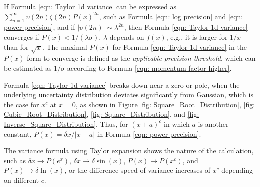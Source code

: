 \documentclass[twoside]{article}
\numberwithin{equation}{section}
\begin{document}
If Formula \eqref{eqn: Taylor 1d variance} can be expressed as $\sum_{n=1}^{\infty} \upsilon(2n) \zeta(2n) P(x)^{2n}$, such as Formula \eqref{eqn: log precision} and \eqref{eqn: power precision}, and if $|\upsilon(2n)| \sim \lambda^{2n}$, then Formula \eqref{eqn: Taylor 1d variance} converges if $P(x) < 1/(\lambda \sigma)$.
$\lambda$ depends on $f(x)$, e.g., it is larger for $1/x$ than for $\sqrt{x}$.
The maximal $P(x)$ for Formula \eqref{eqn: Taylor 1d variance} in the $P(x)$-form to converge is defined as the \emph{applicable precision threshold}, which can be estimated as $1/\sigma$ according to Formula \eqref{eqn: momentum factor higher}.

Formula \eqref{eqn: Taylor 1d variance} breaks down near a zero or pole, when the underlying uncertainty distribution deviates significantly from Gaussian, which is the case for $x^c$ at $x=0$, as shown in Figure \ref{fig: Square_Root_Distribution}, \ref{fig: Cubic_Root_Distribution}, \ref{fig: Square_Distribution}, and \ref{fig: Inverse_Square_Distribution}.
Thus, for $(x+a)^c$ in which $a$ is another constant, $P(x) = \delta x / |x - a|$ in Formula \eqref{eqn: power precision}.

The variance formula using Taylor expansion shows the nature of the calculation, such as $\delta x \rightarrow P(e^x)$, $\delta x \rightarrow \delta \sin(x)$, $P(x) \rightarrow P(x^c)$, and $P(x) \rightarrow \delta \ln(x)$, or the difference speed of variance increases of $x^c$ depending on different $c$.
\end{document}
